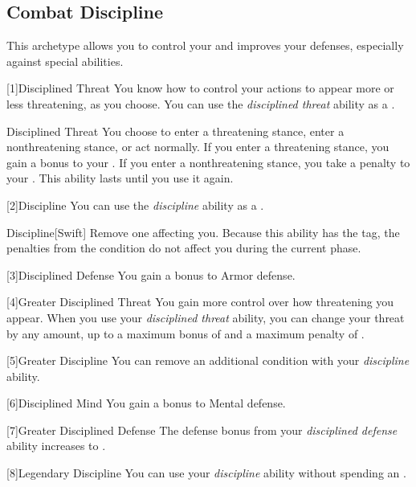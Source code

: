     \subsection{Combat Discipline}
        This archetype allows you to control your  and improves your defenses, especially against special abilities.

        [1]{Disciplined Threat}
        You know how to control your actions to appear more or less threatening, as you choose.
        You can use the \textit{disciplined threat} ability as a .
        \begin{freeability}{Disciplined Threat}
            You choose to enter a threatening stance, enter a nonthreatening stance, or act normally.
            If you enter a threatening stance, you gain a  bonus to your .
            If you enter a nonthreatening stance, you take a  penalty to your .
            This ability lasts until you use it again.
        \end{freeability}

        [2]{Discipline} You can use the \textit{discipline} ability as a .
        \begin{apability}{Discipline}[Swift]
            Remove one  affecting you.
            Because this ability has the  tag, the penalties from the condition do not affect you during the current phase.
        \end{apability}

        [3]{Disciplined Defense}
        You gain a  bonus to Armor defense.

        [4]{Greater Disciplined Threat}
        You gain more control over how threatening you appear.
        When you use your \textit{disciplined threat} ability, you can change your threat by any amount, up to a maximum bonus of  and a maximum penalty of .

        [5]{Greater Discipline}
        You can remove an additional condition with your \textit{discipline} ability.

        [6]{Disciplined Mind}
        You gain a  bonus to Mental defense.

        [7]{Greater Disciplined Defense}
        The defense bonus from your \textit{disciplined defense} ability increases to .

        [8]{Legendary Discipline}
        You can use your \textit{discipline} ability without spending an .

